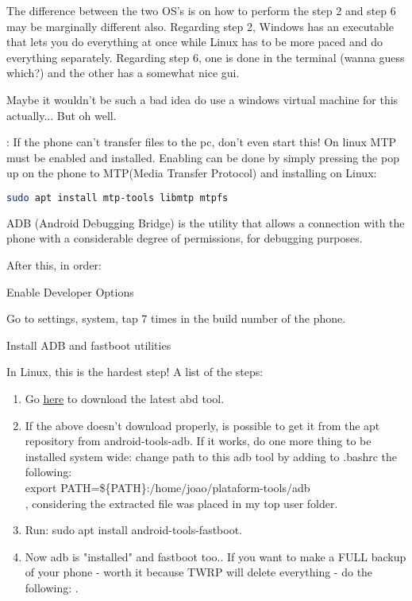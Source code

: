 \par The difference between the two OS's is on how to perform the step 2 and step 6 may be marginally different also. Regarding step 2, Windows has an executable that lets you do everything at once while Linux has to be more paced and do everything separately. Regarding step 6, one is done in the terminal (wanna guess which?) and the other has a somewhat nice gui.  
\par Maybe it wouldn't be such a bad idea do use a windows virtual machine for this actually... But oh well. 


\par {}: If the phone can't transfer files to the pc, don't even start this! On linux MTP must be enabled and installed. Enabling can be done by simply pressing the pop up on the phone to MTP(Media Transfer Protocol) and installing on Linux:
\begin{lstlisting}[language=bash]
    sudo apt install mtp-tools libmtp mtpfs
\end{lstlisting}

\par ADB (Android Debugging Bridge) is the utility that allows a connection with the phone with a considerable degree of permissions, for debugging purposes.


\par After this, in order:


\vspace{.5cm}
{\Large {} Enable Developer Options }
\par Go to settings, system, tap 7 times in the build number of the phone. 

\vspace{.5cm}
{\Large {} Install ADB and fastboot utilities}
\par In Linux, this is the hardest step! A list of the steps:

\begin{enumerate}
    \item Go \href{https://dl.google.com/android/repository/platform-tools-latest-linux.zip}{\ul{here}} to download the latest abd tool.
    \item If the above doesn't download properly, is possible to get it from the apt repository from android-tools-adb. If it works, do one more thing to be installed system wide: change path to this adb tool by adding to .bashrc the following: \\export PATH=\$\{PATH\}:/home/joao/plataform-tools/adb \\, considering the extracted file was placed in my top user folder.
    \item Run: sudo apt install android-tools-fastboot.
    \item Now adb is "installed" and fastboot too.. If you want to make a FULL backup of your phone - worth it because TWRP will delete everything - do the following: .
\end{enumerate}

